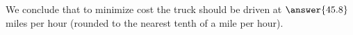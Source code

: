 \documentclass{ximera}
\begin{document}
\begin{exercise}
\begin{exercise}
\begin{exercise}
\begin{exercise}
\begin{exercise}
\begin{exercise}
\begin{exercise}
							We conclude that to minimize cost the truck should be driven at $\answer{45.8}$ miles per hour (rounded to the nearest tenth 
							of a mile per hour).
						  \end{exercise}
					\end{exercise}
				\end{exercise}
			\end{exercise}
		\end{exercise}
	\end{exercise}
\end{exercise}
\end{document}
